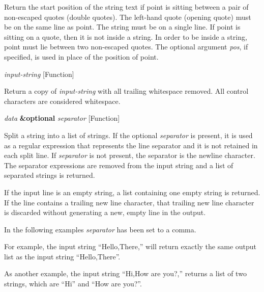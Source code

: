 \begin{doc-string}
Return the start position of the string text if point is sitting between a pair
of non-escaped quotes (double quotes).  The left-hand quote (opening quote) must be
on the same line as point.  The string must be on a single line.  If point is sitting
on a quote, then it is not inside a string.  In order to be inside a string, point
must lie between two non-escaped quotes.  The optional argument \emph{pos}, if specified,
is used in place of the position of point.
\end{doc-string}

\vspace{1em}
\noindent
{}
\usebox{\funcname}\emph{input-string}
 \hfill [Function]

\begin{doc-string}
Return a copy of \emph{input-string} with all trailing whitespace removed.  All control
characters are considered whitespace.
\end{doc-string}

\vspace{1em}
\noindent
{}
\usebox{\funcname}\emph{data} \textbf{\&optional} \emph{separator}
 \hfill [Function]

\begin{doc-string}
Split a string into a list of strings.  If the optional \emph{separator} is present,
it is used as a regular expression that represents the line separator and it is
not retained in each split line.  If \emph{separator} is not present, the separator is
the newline character.  The separator expressions are removed from the
input string and a list of separated strings is returned.

If the input line is an empty string, a list containing one empty string is
returned.  If the line contains a trailing new line character, that trailing new
line character is discarded without generating a new, empty line in the output.

In the following examples \emph{separator} has been set to a comma.

For example, the input string ``Hello,There,'' will return exactly the same
output list as the input string ``Hello,There''.

As another example, the input string ``Hi,How are you?,'' returns a list of
two strings, which are ``Hi'' and ``How are you?''.
\end{doc-string}

